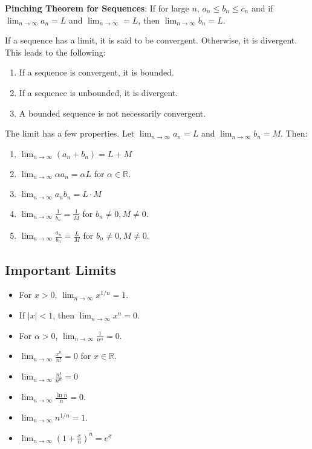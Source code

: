 \documentclass{article}
\begin{document}
        \begin{theorem}
            \textbf{Pinching Theorem for Sequences}: If for large $n$, $a_n \le b_n \le c_n$ and if $\lim_{n\to\infty}a_n = L$ and $\lim_{n\to\infty} = L$, then $\lim_{n\to\infty}b_n = L$.
        \end{theorem}
        If a sequence has a limit, it is said to be convergent. Otherwise, it is divergent.
    This leads to the following:
    \begin{enumerate}
        \item If a sequence is convergent, it is bounded.
        \item If a sequence is unbounded, it is divergent.
        \item A bounded sequence is not necessarily convergent.
    \end{enumerate}
    The limit has a few properties. Let $\lim_{n\to\infty} a_n = L$ and $\lim_{n\to\infty}b_n = M$. Then:
    \begin{enumerate}
        \item $\lim_{n\to\infty}(a_n+b_n) = L+M$
        \item $\lim_{n\to\infty} \alpha a_n = \alpha L$ for $\alpha \in \mathbb{R}$.
        \item $\lim_{n\to\infty} a_nb_n = L \cdot M$
        \item $\lim_{n\to\infty} \frac{1}{b_n} = \frac{1}{M}$ for $b_n \neq 0, M \neq 0$.
        \item $\lim_{n\to\infty} \frac{a_n}{b_n} = \frac{L}{M}$ for $b_n \neq 0, M\neq 0$.
    \end{enumerate}
    \subsection{Important Limits}
    \begin{itemize}
        \item For $x>0$, $\lim_{n\to\infty} x^{1/n} = 1$.
        \item If $|x| < 1$, then $\lim_{n\to \infty} x^n = 0$.
        \item For $\alpha > 0$, $\lim_{n\to\infty} \frac{1}{n^\alpha}=0$.
        \item $\lim_{n\to\infty} \frac{x^n}{n!}=0$ for $x\in \mathbb{R}$.
        \item $\lim_{n\to\infty} \frac{n!}{n^n}=0$
        \item $\lim_{n\to\infty} \frac{\ln n}{n} = 0$.
        \item $\lim_{n\to\infty} n ^{1/n} = 1$.
        \item $\lim_{n\to\infty}\left(1+\frac{x}{n}\right)^n=e^x$
    \end{itemize}
\end{document}
